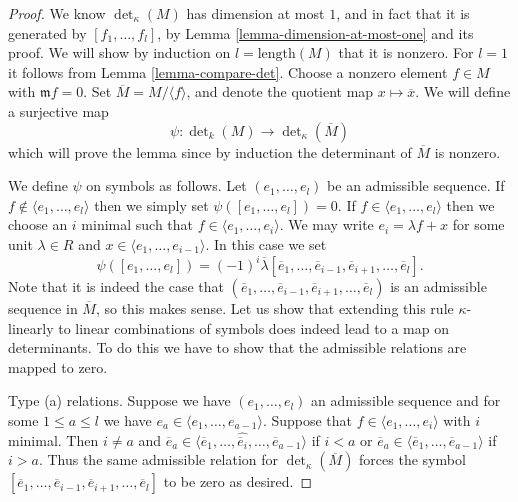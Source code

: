 \begin{proof}
We know $\det_\kappa(M)$ has dimension at most $1$, and in fact that it
is generated by $[f_1, \ldots, f_l]$, by
Lemma \ref{lemma-dimension-at-most-one} and its proof.
We will show by induction on $l = \text{length}(M)$
that it is nonzero. For $l = 1$ it follows from Lemma \ref{lemma-compare-det}.
Choose a nonzero element $f \in M$
with $\mathfrak m f = 0$. Set $\overline{M} = M /\langle f \rangle$,
and denote the quotient map $x \mapsto \overline{x}$.
We will define a surjective map
$$
\psi : \det\nolimits_k(M) \to \det\nolimits_\kappa(\overline{M})
$$
which will prove the lemma since by induction the determinant of
$\overline{M}$ is nonzero.

\medskip\noindent
We define $\psi$ on symbols as follows.
Let $(e_1, \ldots, e_l)$ be an admissible sequence.
If $f \not \in \langle e_1, \ldots, e_l \rangle$ then
we simply set $\psi([e_1, \ldots, e_l]) = 0$.
If $f \in \langle e_1, \ldots, e_l \rangle$ then we choose
an $i$ minimal such that $f \in \langle e_1, \ldots, e_i \rangle$.
We may write $e_i = \lambda f + x$ for some unit $\lambda \in R$
and $x \in \langle e_1, \ldots, e_{i - 1} \rangle$.
In this case we set
$$
\psi([e_1, \ldots, e_l]) =
(-1)^i
\overline{\lambda}[\overline{e}_1, \ldots,
\overline{e}_{i - 1},
\overline{e}_{i + 1}, \ldots, \overline{e}_l].
$$
Note that it is indeed the case that
$(\overline{e}_1, \ldots,
\overline{e}_{i - 1},
\overline{e}_{i + 1}, \ldots, \overline{e}_l)$
is an admissible sequence in $\overline{M}$, so this makes sense.
Let us show that extending this rule $\kappa$-linearly to
linear combinations of symbols does indeed lead to a map on
determinants. To do this we have to show that the admissible
relations are mapped to zero.

\medskip\noindent
Type (a) relations. Suppose we have $(e_1, \ldots, e_l)$ an
admissible sequence and for some $1 \leq a \leq l$ we have
$e_a \in \langle e_1, \ldots, e_{a - 1}\rangle$.
Suppose that $f \in \langle e_1, \ldots, e_i\rangle$ with $i$ minimal.
Then $i \not = a$ and
$\overline{e}_a \in \langle \overline{e}_1, \ldots,
\hat{\overline{e}_i}, \ldots, \overline{e}_{a - 1}\rangle$ if $i < a$
or
$\overline{e}_a \in \langle \overline{e}_1, \ldots,
\overline{e}_{a - 1}\rangle$ if $i > a$.
Thus the same admissible relation for $\det_\kappa(\overline{M})$ forces
the symbol $[\overline{e}_1, \ldots,
\overline{e}_{i - 1},
\overline{e}_{i + 1}, \ldots, \overline{e}_l]$
to be zero as desired.


\end{proof}
